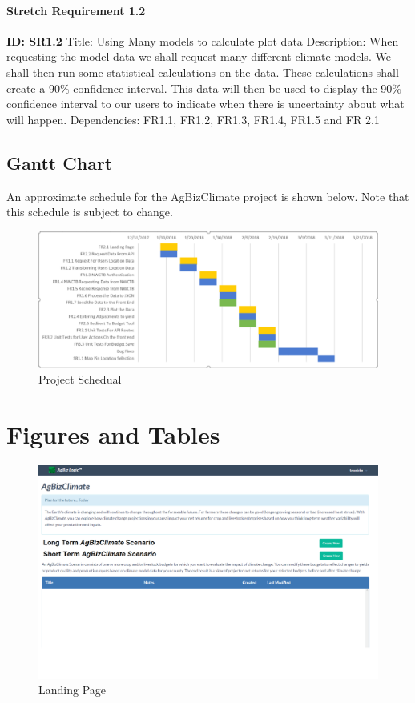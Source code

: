 \documentclass[onecolumn, draftclsnofoot,10pt, compsoc]{article}
\begin{document}
						\paragraph{Stretch Requirement 1.2}
							\textbf{ID: SR1.2}\hfill \break
							Title: Using Many models to calculate plot data \hfill \break
							Description: When requesting the model data we shall request many different climate models. We shall then run some statistical calculations on the data. These calculations shall create a 90\% confidence interval. This data will then be used to display the 90\% confidence interval to our users to indicate when there is uncertainty about what will happen.
							Dependencies: FR1.1, FR1.2, FR1.3, FR1.4, FR1.5 and FR 2.1
\begin{landscape}
	\section{Gantt Chart}
		An approximate schedule for the AgBizClimate project is shown below. Note that this schedule is subject to change.
	
		\begin{figure} [h]
			\includegraphics[width =\linewidth]{Figures/GanttChart.eps}
			\caption{Project Schedual}
			\label{fig:Gantt}
		\end{figure}
\end{landscape}


\section{Figures and Tables} \label{ref:FigTab}

	\begin{figure}[h]
		\includegraphics[width=\linewidth]{Figures/LandingPage.eps}
		\caption{Landing Page}
		\label{figure3.1}
	\end{figure}
					
\end{document}
